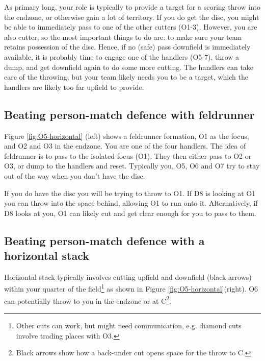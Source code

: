 \documentclass{tufte-handout}
\begin{document}
As primary long, 
your role is 
typically to provide 
a target for a scoring throw 
into the endzone, or 
otherwise gain a lot of 
territory. If you do get the disc,
you might be able to immediately
pass to one of the other cutters 
(O1-3). 
However, 
you are also cutter, 
so the most 
important things to do are:
to make sure your team 
retains possession of the disc.
Hence, 
if no (safe) pass downfield 
is immediately available, 
it is probably time to engage 
one of the handlers (O5-7), 
throw a dump, 
and get downfield again 
to do some more cutting.  
The handlers can take care
of the throwing, 
but your team likely 
needs you to be a target, 
which the handlers are likely 
too far upfield to provide.


\subsection{Beating person-match defence with feldrunner}
\label{sec:feld}
Figure \ref{fig:O5-horizontal} (left) 
shows a feldrunner formation, 
O1 as the focus, and 
O2 and O3 
in the endzone. 
You are one 
of the four handlers. 
The idea of feldrunner 
is to pass to 
the isolated
focus (O1). 
They then either pass to 
O2 or O3, 
or dump to the handlers
and reset. 
Typically you, 
O5, 
O6 
and O7 
try to stay out of the way 
when you don't have the disc. 

If you do have the disc 
you will be trying
to throw to O1. 
If D8 
is looking at O1 
you can throw 
into the space behind, 
allowing O1 to run onto it. 
Alternatively, if 
D8 looks at you, 
O1 can likely cut
and get clear enough 
for you to pass to them. 

\subsection{Beating person-match defence with a horizontal stack}\label{sec:horizontall}
Horizontal stack 
typically involves cutting
upfield and downfield (black arrows)
within your quarter of the field\footnote{
Other cuts
can work, 
but might need
communication,
e.g. diamond cuts 
involve trading places 
with O3.}
as shown in 
Figure \ref{fig:O5-horizontal}(right).
O6 
can potentially 
throw to you 
in the endzone 
or at C\footnote{
Black arrows
show how a back-under cut 
opens space 
for the throw 
to C.}. 
\end{document}

